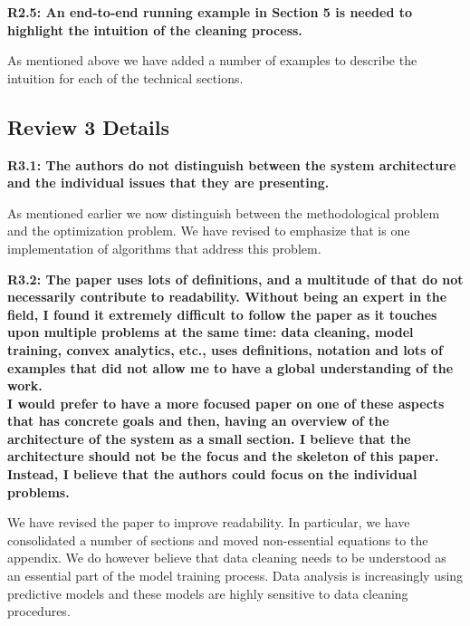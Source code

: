 \vspace{0.5em}

\textbf{R2.5: An end-to-end running example in Section 5 is needed to highlight the intuition of the cleaning process.}

As mentioned above we have added a number of examples to describe the intuition for each of the technical sections.

\vspace{0.5em}


\subsection*{Review 3 Details}
\noindent\textbf{R3.1: The authors do not distinguish between the system architecture and the individual issues that they are presenting.}

As mentioned earlier we now distinguish between the methodological problem and the optimization problem.
We have revised to emphasize that \sys is one implementation of algorithms that address this problem.

\vspace{0.5em}

\noindent\textbf{R3.2: The paper uses lots of definitions, and a multitude of that do not necessarily contribute to readability.
Without being an expert in the field, I found it extremely difficult to follow the paper as it touches upon multiple problems at the same time: data cleaning, model training, convex analytics, etc., uses definitions, notation and lots of examples that did not allow me to have a global understanding of the work.\\
I would prefer to have a more focused paper on one of these aspects that has concrete goals and then, having an overview of the architecture of the system as a small section. I believe that the architecture should not be the focus and the skeleton of this paper. Instead, I believe that the authors could focus on the individual problems.}

We have revised the paper to improve readability. In particular, we have consolidated a number of sections and moved non-essential equations to the appendix. We do however believe that data cleaning needs to be understood as an essential part of the model training process. Data analysis is increasingly using predictive models and these models are highly sensitive to data cleaning procedures.
